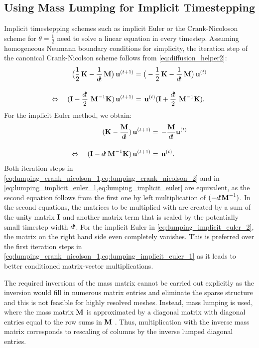 \subsection{Using Mass Lumping for Implicit Timestepping}\label{sec:mass_lumping}
Implicit timestepping schemes such as implicit Euler or the Crank-Nicoloson scheme for $\theta=\frac12$ need to solve a linear equation in every timestep.
Assuming homogeneous Neumann boundary conditions for simplicity, the iteration step of the canonical Crank-Nicolson scheme follows from \cref{eq:diffusion_helper2}:
\begin{subequations}\label{eq:lumping_crank_nicolson}
  \begin{align}
    \big(\dfrac1{2}\bfK-\dfrac{1}{\dt}\bfM\big)\, \bfu^{(t+1)} &= \big(-\dfrac12{\bfK} - \dfrac{1}{\dt}\bfM\big)\, \bfu^{(t)}\label{eq:lumping_crank_nicolson_1}\\[4mm]
    \Leftrightarrow \quad (\bfI - \dfrac{\dt}{2}\,\bfM^{-1}\bfK)\,\bfu^{(t+1)}&= \,\bfu^{(t)}(\bfI + \dfrac{\dt}{2}\,\bfM^{-1}\bfK).\label{eq:lumping_crank_nicolson_2}
  \end{align}
\end{subequations}
For the implicit Euler method, we obtain:%
\begin{subequations}\label{eq:lumping_implicit_euler}
  \begin{align}
    \ds(\bfK-\frac{\bfM}{\dt})\,\bfu^{(t+1)} &=\,\ds -\frac{\bfM}{\dt}\bfu^{(t)}\label{eq:lumping_implicit_euler_1}\\[4mm]
    \Leftrightarrow \quad (\bfI - \dt\,\bfM^{-1}\bfK)\,\bfu^{(t+1)}&= \,\bfu^{(t)}.\label{eq:lumping_implicit_euler_2}
  \end{align}
\end{subequations}
Both iteration steps in \cref{eq:lumping_crank_nicolson_1,eq:lumping_crank_nicolson_2} and in \cref{eq:lumping_implicit_euler_1,eq:lumping_implicit_euler} are equivalent, as the second equation follows from the first one by left multiplication of $(-\dt \bfM^{-1})$. In the second equations, the matrices to be multiplied with are created by a sum of the unity matrix $\textbf{I}$ and another matrix term that is scaled by the potentially small timestep width $\dt$. For the implicit Euler in \cref{eq:lumping_implicit_euler_2}, the matrix on the right hand side even completely vanishes. This is preferred over the first iteration steps in \cref{eq:lumping_crank_nicolson_1,eq:lumping_implicit_euler_1} as it leads to better conditioned matrix-vector multiplications.

The required inversions of the mass matrix cannot be carried out explicitly as the inversion would fill in numerous matrix entries and eliminate the sparse structure and this is not feasible for highly resolved meshes. Instead, mass lumping is used, where the mass matrix $\textbf{M}$ is approximated by a diagonal matrix with diagonal entries equal to the row sums in $\textbf{M}$ \cite{Hinton1976}. Thus, multiplication with the inverse mass matrix corresponds to rescaling of columns by the inverse lumped diagonal entries.

